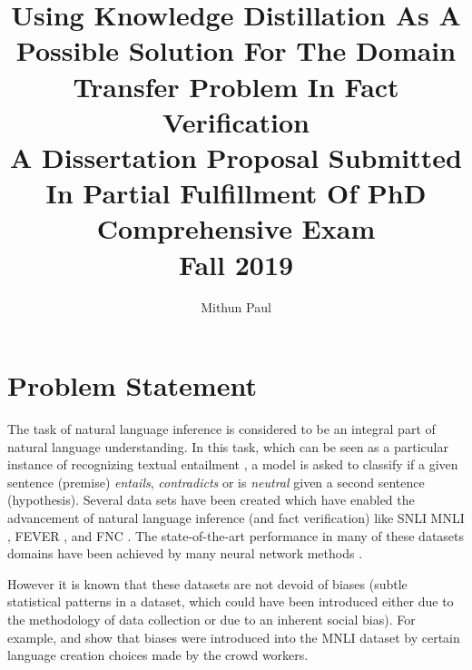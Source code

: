 \documentclass{article}
\begin{document}
\title{Using Knowledge Distillation As A Possible Solution For The Domain Transfer Problem In Fact Verification \\
\large{A Dissertation Proposal Submitted In Partial Fulfillment Of PhD Comprehensive Exam \\
 Fall 2019}}


\author{Mithun Paul\\}

\maketitle

\tableofcontents

\section{Problem Statement}

The task of natural language inference is considered to be an integral part of natural language understanding. In this task, which can be seen as a particular instance of recognizing textual entailment \citep*{fyodorov2000natural,condoravdi2003entailment,bos2005recognising,maccartney2009extended,dagan2013recognizing}, a model is asked to classify if a given sentence (premise) \textit{entails}, \textit{contradicts} or is \textit{neutral} given a second sentence (hypothesis). Several data sets have been created which have enabled the advancement of natural language inference (and fact verification) like SNLI \citep*{bowman2015large} MNLI \citep*{williams2017broad}, FEVER \citep*{thorne2018fever}, and FNC \citep*{pomerleau2017fake}. The state-of-the-art  performance in many of these datasets domains have been achieved by many neural network methods \citep*{kim2018semantic}.

However it is known that these datasets are not devoid of biases (subtle statistical patterns in a dataset, which could have been introduced either due to the methodology of data collection or due to an inherent social bias). For example, \citep*{gururangan2018annotation} and \citep*{poliak2018hypothesis} show that biases were introduced into the MNLI dataset by certain language creation choices made by the crowd workers. 
\end{document}
